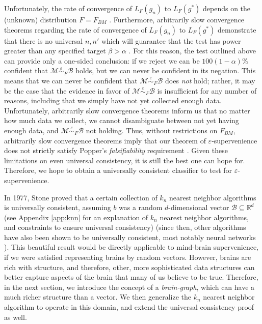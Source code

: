 \documentclass{article}
\newcommand{\mB}{\mathcal{B}}
\newcommand{\mM}{\mathcal{M}}
\newcommand{\Real}{\mathbb{R}}           %
\newcommand{\eps}{\varepsilon}
\providecommand{\mc}[1]{\mathcal{#1}}
\newcommand{\MeB}{\mM \overset{\varepsilon}{{\sim}}_F \mB}
\providecommand{\tr}[1]{\textcolor{black}{#1}}
\begin{document}
Unfortunately, the rate of convergence of $L_{F}(g_n)$ to $L_{F}(g^*)$ depends on the (unknown) distribution $F=F_{BM}$ \cite{DGL96}. Furthermore, arbitrarily slow convergence theorems regarding the rate of convergence of $L_{F}(g_n)$ to $L_{F}(g^*)$ demonstrate that there is no universal $n,n'$ which will guarantee that the test has power greater than any specified target $\beta > \alpha$ \cite{Devroye83}. For this reason, the test outlined above can provide only a one-sided conclusion: if we reject we can be $100(1-\alpha)$\% confident that $\MeB$ holds, but we can never be confident in its negation.  This means that we can never be confident that $\MeB$ does \emph{not} hold; rather, it may be the case that the evidence in favor of $\MeB$ is insufficient for any number of reasons, including that we simply have not yet collected enough data. Unfortunately, arbitrarily slow convergence theorems inform us that no matter how much data we collect, we cannot disambiguate between not yet having enough data, and $\MeB$ not holding.  Thus, without restrictions on $F_{BM}$, arbitrarily slow convergence theorems imply that our theorem of $\varepsilon$-supervenience does not \tr{strictly} satisfy Popper's {\it falsifiability} requirement \cite{Popper}. Given these limitations on even universal consistency, it is still the best one can hope for.  Therefore, we hope to obtain a universally consistent classifier to test for $\eps$-supervenience.

In 1977, Stone proved that a certain collection of $k_n$ nearest neighbor algorithms is universally consistent, assuming $b$ was a random $d$-dimensional vector $\mc{B} \subseteq \Real^d$ \cite{Stone77} (see Appendix \ref{app:knn} for an explanation of $k_n$ nearest neighbor algorithms, and constraints to ensure universal consistency) (since then, other algorithms have also been shown to be universally consistent, most notably neural networks \cite{Cybenko89}).  This beautiful result would be directly applicable to mind-brain supervenience, if we were satisfied representing brains by random vectors.  However, brains are rich with structure, and therefore, other, more sophisticated data structures can better capture aspects of the brain that many of us believe to be true. Therefore, in the next section, we introduce the concept of a \emph{brain-graph}, which can have a much richer structure than a vector.  We then generalize the $k_n$ nearest neighbor algorithm to operate in this domain, and extend the universal consistency proof as well.


\end{document}
